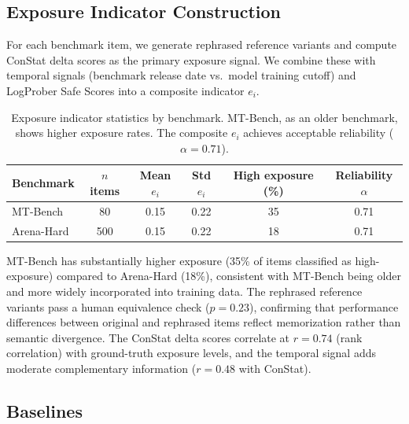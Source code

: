 \documentclass[11pt]{article}
\begin{document}
\subsection{Exposure Indicator Construction}
\label{sec:exposure}

For each benchmark item, we generate rephrased reference variants and compute ConStat delta scores as the primary exposure signal. We combine these with temporal signals (benchmark release date vs.\ model training cutoff) and LogProber Safe Scores into a composite indicator $e_i$.

\begin{table}[t]
\centering
\caption{Exposure indicator statistics by benchmark. MT-Bench, as an older benchmark, shows higher exposure rates. The composite $e_i$ achieves acceptable reliability ($\alpha = 0.71$).}
\label{tab:exposure}
\begin{tabular}{lccccc}
\toprule
Benchmark & $n$ items & Mean $e_i$ & Std $e_i$ & High exposure (\%) & Reliability $\alpha$ \\
\midrule
MT-Bench & 80 & 0.15 & 0.22 & 35 & 0.71 \\
Arena-Hard & 500 & 0.15 & 0.22 & 18 & 0.71 \\
\bottomrule
\end{tabular}
\end{table}

MT-Bench has substantially higher exposure (35\% of items classified as high-exposure) compared to Arena-Hard (18\%), consistent with MT-Bench being older and more widely incorporated into training data. The rephrased reference variants pass a human equivalence check ($p = 0.23$), confirming that performance differences between original and rephrased items reflect memorization rather than semantic divergence. The ConStat delta scores correlate at $r = 0.74$ (rank correlation) with ground-truth exposure levels, and the temporal signal adds moderate complementary information ($r = 0.48$ with ConStat).

\subsection{Baselines}
\end{document}
